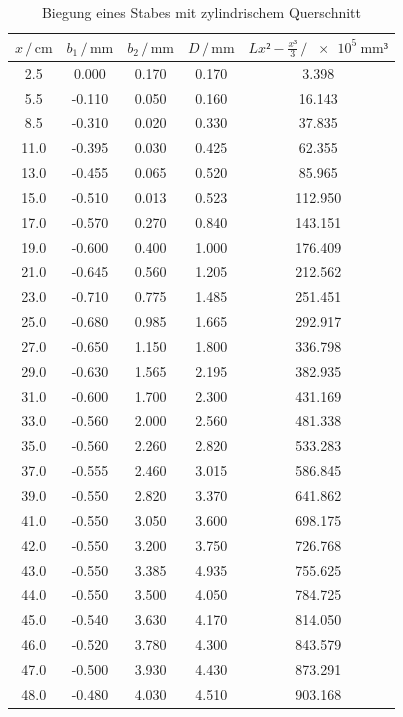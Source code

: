 \begin{table}
\centering
\caption{Biegung eines Stabes mit zylindrischem Querschnitt}
\label{tab:Messdaten2}
\begin{tabular}{c c c c c}
\toprule
$x \,/\, \si{\centi\meter}$ & $b_1 \,/\, \si{\milli\meter}$ & 
$b_2 \,/\, \si{\milli\meter}$ & $D \,/\, \si{\milli\meter}$ &
$Lx²-\frac{x³}{3} \,/\, \SI{e5}{\milli\meter³}$\\
\midrule
 2.5 &  0.000 & 0.170 & 0.170 &   3.398\\
 5.5 & -0.110 & 0.050 & 0.160 &  16.143\\
 8.5 & -0.310 & 0.020 & 0.330 &  37.835\\
11.0 & -0.395 & 0.030 & 0.425 &  62.355\\
13.0 & -0.455 & 0.065 & 0.520 &  85.965\\
15.0 & -0.510 & 0.013 & 0.523 & 112.950\\
17.0 & -0.570 & 0.270 & 0.840 & 143.151\\
19.0 & -0.600 & 0.400 & 1.000 & 176.409\\
21.0 & -0.645 & 0.560 & 1.205 & 212.562\\
23.0 & -0.710 & 0.775 & 1.485 & 251.451\\
25.0 & -0.680 & 0.985 & 1.665 & 292.917\\
27.0 & -0.650 & 1.150 & 1.800 & 336.798\\
29.0 & -0.630 & 1.565 & 2.195 & 382.935\\
31.0 & -0.600 & 1.700 & 2.300 & 431.169\\
33.0 & -0.560 & 2.000 & 2.560 & 481.338\\
35.0 & -0.560 & 2.260 & 2.820 & 533.283\\
37.0 & -0.555 & 2.460 & 3.015 & 586.845\\
39.0 & -0.550 & 2.820 & 3.370 & 641.862\\
41.0 & -0.550 & 3.050 & 3.600 & 698.175\\
42.0 & -0.550 & 3.200 & 3.750 & 726.768\\
43.0 & -0.550 & 3.385 & 4.935 & 755.625\\
44.0 & -0.550 & 3.500 & 4.050 & 784.725\\
45.0 & -0.540 & 3.630 & 4.170 & 814.050\\
46.0 & -0.520 & 3.780 & 4.300 & 843.579\\
47.0 & -0.500 & 3.930 & 4.430 & 873.291\\
48.0 & -0.480 & 4.030 & 4.510 & 903.168\\
\bottomrule
\end{tabular}
\end{table}

